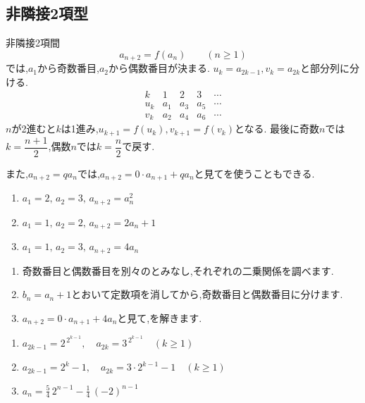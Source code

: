 \subsection{非隣接2項型}\label{節：非隣接2項型}

非隣接2項間
\[
  a_{n+2}=f(a_n)\qquad(n\ge1)
\]
では,$a_1$から奇数番目,$a_2$から偶数番目が決まる.
$u_k=a_{2k-1},v_k=a_{2k}$と部分列に分ける.
\[
  \begin{array}{c|cccc}
    k&1&2&3&\cdots\\ \hline
    u_k&a_1&a_3&a_5&\cdots\\
    v_k&a_2&a_4&a_6&\cdots
  \end{array}
\]
$n$が2進むと$k$は1進み,$u_{k+1}=f(u_k),v_{k+1}=f(v_k)$となる.
最後に奇数$n$では$k=\dfrac{n+1}{2}$,偶数$n$では$k=\dfrac{n}{2}$で戻す.

また,$a_{n+2}=qa_n$では,$a_{n+2}=0\cdot a_{n+1}+qa_n$と見てを使うこともできる.

\noindent {}\par\nobreak
\begin{enumerate}[label=(\arabic*),parsep=3pt,format=\bookitemlink{example-nonadjacent-1}{problem}{answer}]
  \item $\displaystyle a_1=2,\,a_2=3,\,a_{n+2}=a_n^2$
  \item $\displaystyle a_1=1,\,a_2=2,\,a_{n+2}=2a_n+1$
  \item $\displaystyle a_1=1,\,a_2=3,\,a_{n+2}=4a_n$
\end{enumerate}

\noindent{}\par\nobreak
\begin{enumerate}[label=(\arabic*),parsep=3pt,format=\bookitemlink{example-nonadjacent-1}{hint}{problem}]
  \item 奇数番目と偶数番目を別々のとみなし,それぞれの二乗関係を調べます.
  \item $b_n=a_n+1$とおいて定数項を消してから,奇数番目と偶数番目に分けます.
  \item $a_{n+2}=0\cdot a_{n+1}+4a_n$と見て,を解きます.
\end{enumerate}

\noindent{}\par\nobreak
\begin{enumerate}[label=(\arabic*),parsep=3pt,format=\bookitemlink{example-nonadjacent-1}{answer}{problem}]
  \item $\displaystyle a_{2k-1}=2^{\,2^{k-1}},\quad a_{2k}=3^{\,2^{k-1}}\quad(k\ge1)$
  \item $\displaystyle a_{2k-1}=2^k-1,\quad a_{2k}=3\cdot2^{k-1}-1\quad(k\ge1)$
  \item $\displaystyle a_n=\frac54\,2^{n-1}-\frac14\,(-2)^{n-1}$
\end{enumerate}

